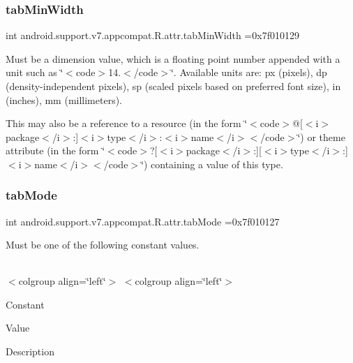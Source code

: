 \subsubsection{\texorpdfstring{tab\+Min\+Width}{tabMinWidth}}
{\footnotesize\ttfamily int android.\+support.\+v7.\+appcompat.\+R.\+attr.\+tab\+Min\+Width =0x7f010129\hspace{0.3cm}{\ttfamily [static]}}

Must be a dimension value, which is a floating point number appended with a unit such as \char`\"{}$<$code$>$14.\+5sp$<$/code$>$\char`\"{}. Available units are\+: px (pixels), dp (density-\/independent pixels), sp (scaled pixels based on preferred font size), in (inches), mm (millimeters). 

This may also be a reference to a resource (in the form \char`\"{}$<$code$>$@\mbox{[}$<$i$>$package$<$/i$>$\+:\mbox{]}$<$i$>$type$<$/i$>$\+:$<$i$>$name$<$/i$>$$<$/code$>$\char`\"{}) or theme attribute (in the form \char`\"{}$<$code$>$?\mbox{[}$<$i$>$package$<$/i$>$\+:\mbox{]}\mbox{[}$<$i$>$type$<$/i$>$\+:\mbox{]}$<$i$>$name$<$/i$>$$<$/code$>$\char`\"{}) containing a value of this type. \mbox{\label{classandroid_1_1support_1_1v7_1_1appcompat_1_1R_1_1attr_aa0a566b845b8df7ff84ec70c2aadf43f}} 
\subsubsection{\texorpdfstring{tab\+Mode}{tabMode}}
{\footnotesize\ttfamily int android.\+support.\+v7.\+appcompat.\+R.\+attr.\+tab\+Mode =0x7f010127\hspace{0.3cm}{\ttfamily [static]}}

Must be one of the following constant values.

\tabulinesep=1mm
\begin{longtabu} spread 0pt [c]{*{0}{|X[-1]}|}
\hline
\end{longtabu}
$<$colgroup align=\char`\"{}left\char`\"{}$>$ $<$colgroup align=\char`\"{}left\char`\"{}$>$ 

Constant

Value

Description 

